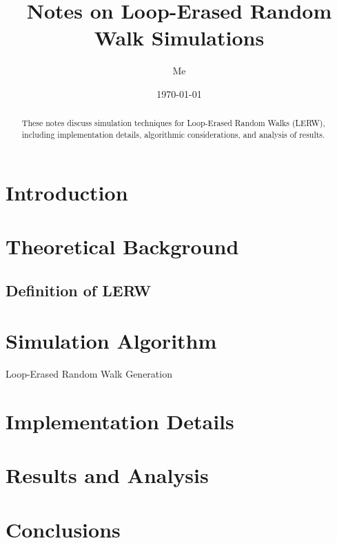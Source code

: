 \documentclass[11pt,a4paper]{article}
\title{Notes on Loop-Erased Random Walk Simulations}
\author{Me}
\date{\today}
\theoremstyle{plain}
\theoremstyle{definition}
\theoremstyle{remark}
\begin{document}
\maketitle

\begin{abstract}
These notes discuss simulation techniques for Loop-Erased Random Walks (LERW), including implementation details, algorithmic considerations, and analysis of results.
\end{abstract}

\section{Introduction}

\section{Theoretical Background}
\subsection{Definition of LERW}

\section{Simulation Algorithm}
\begin{algorithm}
\caption{Loop-Erased Random Walk Generation}
\begin{algorithmic}[1]
\end{algorithmic}
\end{algorithm}

\section{Implementation Details}

\section{Results and Analysis}

\section{Conclusions}



\end{document}
